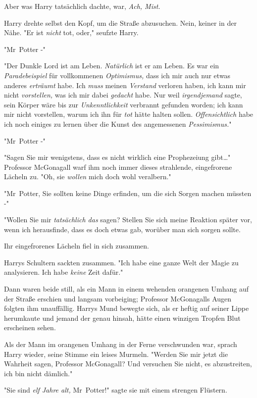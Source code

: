 {Aber was Harry tatsächlich dachte, war, \emph{Ach, Mist.}

Harry drehte selbst den Kopf, um die Straße abzusuchen. Nein, keiner in der Nähe. "Er ist \emph{nicht} tot, oder," seufzte Harry.

"Mr~Potter -"

"Der Dunkle Lord ist am Leben. \emph{Natürlich} ist er am Leben. Es war ein \emph{Paradebeispiel} für vollkommenen \emph{Optimismus,} dass ich mir auch nur etwas anderes \emph{erträumt} habe. Ich \emph{muss} meinen \emph{Verstand} verloren haben, ich kann mir nicht \emph{vorstellen,} was ich mir dabei \emph{gedacht} habe. Nur weil \emph{irgendjemand} sagte, sein Körper wäre bis zur \emph{Unkenntlichkeit} verbrannt gefunden worden; ich kann mir nicht vorstellen, warum ich ihn für \emph{tot} hätte halten sollen. \emph{Offensichtlich} habe ich noch einiges zu lernen über die Kunst des angemessenen \emph{Pessimismus.}"

"Mr~Potter -"

"Sagen Sie mir wenigstens, dass es nicht wirklich eine Prophezeiung gibt…" Professor McGonagall warf ihm noch immer dieses strahlende, eingefrorene Lächeln zu. "Oh, sie \emph{wollen} mich doch wohl veralbern."

"Mr~Potter, Sie sollten keine Dinge erfinden, um die sich Sorgen machen müssten -"

"Wollen Sie mir \emph{tatsächlich das} sagen? Stellen Sie sich meine Reaktion später vor, wenn ich herausfinde, dass es doch etwas gab, worüber man sich sorgen sollte.

Ihr eingefrorenes Lächeln fiel in sich zusammen.

Harrys Schultern sackten zusammen. "Ich habe eine ganze Welt der Magie zu analysieren. Ich habe \emph{keine} Zeit dafür."

Dann waren beide still, als ein Mann in einem wehenden orangenen Umhang auf der Straße erschien und langsam vorbeiging; Professor McGonagalls Augen folgten ihm unauffällig. Harrys Mund bewegte sich, als er heftig auf seiner Lippe herumkaute und jemand der genau hinsah, hätte einen winzigen Tropfen Blut erscheinen sehen.

Als der Mann im orangenen Umhang in der Ferne verschwunden war, sprach Harry wieder, seine Stimme ein leises Murmeln. "Werden Sie mir jetzt die Wahrheit sagen, Professor McGonagall? Und versuchen Sie nicht, es abzustreiten, ich bin nicht dämlich."

"Sie sind \emph{elf Jahre alt,} Mr~Potter!" sagte sie mit einem strengen Flüstern.

}
